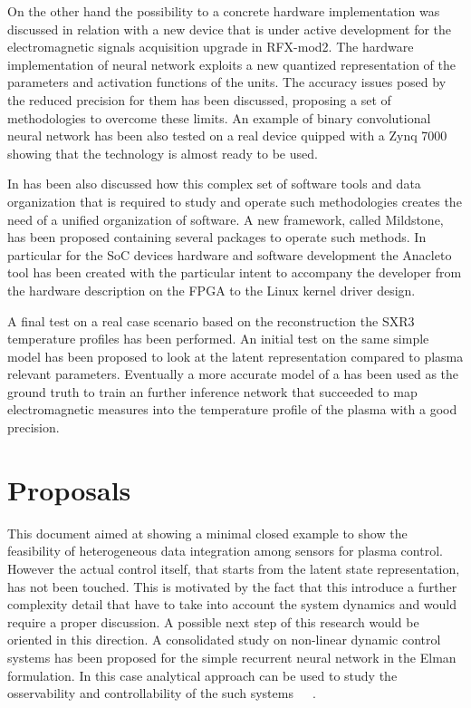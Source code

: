 On the other hand the possibility to a concrete hardware implementation was discussed in relation with a new device that is under active development for the electromagnetic signals acquisition upgrade in RFX-mod2.
The hardware implementation of neural network exploits a new quantized representation of the parameters and activation functions of the units. The accuracy issues posed by the reduced precision for them has been discussed, proposing a set of methodologies to overcome these limits. An example of binary convolutional neural network has been also tested on a real device quipped with a Zynq 7000 showing that the technology is almost ready to be used.

In has been also discussed how this complex set of software tools and data organization that is required to study and operate such methodologies creates the need of a unified organization of software. 
A new framework, called Mildstone, has been proposed containing several packages to operate such methods.
In particular for the SoC devices hardware and software development the Anacleto tool has been created with the particular intent to accompany the developer from the hardware description on the FPGA to the Linux kernel driver design.

A final test on a real case scenario based on the reconstruction the SXR3 temperature profiles has been performed.
An initial test on the same  simple model has been proposed to look at the latent representation compared to plasma relevant parameters. Eventually a more accurate model of a  has been used as the ground truth to train an further inference network that succeeded to map electromagnetic measures into the temperature profile of the plasma with a good precision.

\section{Proposals}

This document aimed at showing a minimal closed example to show the feasibility of heterogeneous data integration among sensors for plasma control. However the actual control itself, that starts from the latent state representation, has not been touched.
This is motivated by the fact that this introduce a further complexity detail that have to take into account the system dynamics and would require a proper discussion.
A possible next step of this research would be oriented in this direction. A consolidated study on non-linear dynamic control systems has been proposed for the simple recurrent neural network in the Elman formulation. In this case analytical approach can be used to study the osservability and controllability of the such systems~\cite{albertini1995forward}~\cite{albertini1994state}~\cite{sontag1997complete}.


